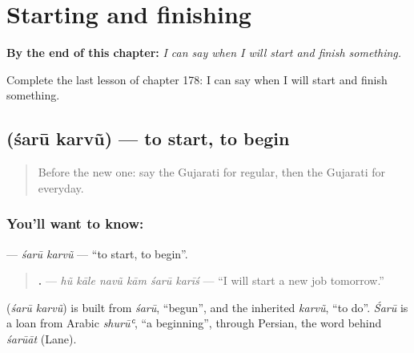 
\chapter{Starting and finishing}
\label{ch:gu-starting-and-finishing}

\begin{chapteropening}
\textbf{By the end of this chapter:} \emph{I can say when I will start and finish something.}

Complete the last lesson of chapter 178: I can say when I will start and finish something.
\end{chapteropening}

\section[\texorpdfstring{\gu{શરૂ} \gu{કરવું} (śarū karvũ)}{શરૂ કરવું (śarū karvũ)}]{  (śarū karvũ) — to start, to begin}

\label{lesson:GU-C178-saru-karvu}



\begin{quote}
Before the new one: say the Gujarati for regular, then the Gujarati for everyday.
\end{quote}

\subsection*{You'll want to know:  }
\textbf{ } — \emph{śarū karvũ} — \textquotedblleft{}to start, to begin\textquotedblright{}.

\begin{quote}
\textbf{     .} — \emph{hũ kāle navũ kām śarū karīś} — \textquotedblleft{}I will start a new job tomorrow.\textquotedblright{}
\end{quote}

\begin{cousinweb}
\textbf{ } (\emph{śarū karvũ}) is built from \emph{śarū}, \textquotedblleft{}begun\textquotedblright{}, and the inherited \emph{karvũ}, \textquotedblleft{}to do\textquotedblright{}. \emph{Śarū} is a loan from Arabic \emph{shurūʿ}, \textquotedblleft{}a beginning\textquotedblright{}, through Persian, the word behind \emph{śarūāt} (Lane).
\end{cousinweb}

